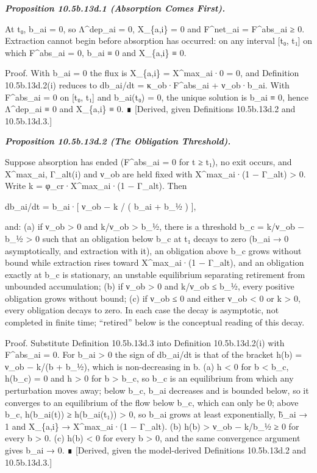 \documentclass[
]{article}
\begin{document}
\emph{\textbf{Proposition 10.5b.13d.1 (Absorption Comes First).}}

At t₀, b\_ai = 0, so Λ\^{}dep\_ai = 0, X\_\{a,i\} = 0 and F\^{}net\_ai =
F\^{}abs\_ai ≥ 0. Extraction cannot begin before absorption has
occurred: on any interval {[}t₀, t₁{]} on which F\^{}abs\_ai = 0, b\_ai
≡ 0 and X\_\{a,i\} ≡ 0.

Proof. With b\_ai = 0 the flux is X\_\{a,i\} = X\^{}max\_ai·0 = 0, and
Definition 10.5b.13d.2(i) reduces to db\_ai/dt = κ\_ob·F\^{}abs\_ai +
ν\_ob·b\_ai. With F\^{}abs\_ai = 0 on {[}t₀, t₁{]} and b\_ai(t₀) = 0,
the unique solution is b\_ai ≡ 0, hence Λ\^{}dep\_ai ≡ 0 and X\_\{a,i\}
≡ 0. ∎ {[}Derived, given Definitions 10.5b.13d.2 and 10.5b.13d.3.{]}

\emph{\textbf{Proposition 10.5b.13d.2 (The Obligation Threshold).}}

Suppose absorption has ended (F\^{}abs\_ai = 0 for t ≥ t₁), no exit
occurs, and X\^{}max\_ai, Γ\_alt(i) and ν\_ob are held fixed with
X\^{}max\_ai·(1 − Γ\_alt) \textgreater{} 0. Write k =
φ\_cr·X\^{}max\_ai·(1 − Γ\_alt). Then

db\_ai/dt = b\_ai·{[} ν\_ob − k / ( b\_ai + b\_½ ) {]},

and: (a) if ν\_ob \textgreater{} 0 and k/ν\_ob \textgreater{} b\_½,
there is a threshold b\_c = k/ν\_ob − b\_½ \textgreater{} 0 such that an
obligation below b\_c at t₁ decays to zero (b\_ai → 0 asymptotically,
and extraction with it), an obligation above b\_c grows without bound
while extraction rises toward X\^{}max\_ai·(1 − Γ\_alt), and an
obligation exactly at b\_c is stationary, an unstable equilibrium
separating retirement from unbounded accumulation; (b) if ν\_ob
\textgreater{} 0 and k/ν\_ob ≤ b\_½, every positive obligation grows
without bound; (c) if ν\_ob ≤ 0 and either ν\_ob \textless{} 0 or k
\textgreater{} 0, every obligation decays to zero. In each case the
decay is asymptotic, not completed in finite time; ``retired'' below is
the conceptual reading of this decay.

Proof. Substitute Definition 10.5b.13d.3 into Definition 10.5b.13d.2(i)
with F\^{}abs\_ai = 0. For b\_ai \textgreater{} 0 the sign of db\_ai/dt
is that of the bracket h(b) = ν\_ob − k/(b + b\_½), which is
non-decreasing in b. (a) h \textless{} 0 for b \textless{} b\_c, h(b\_c)
= 0 and h \textgreater{} 0 for b \textgreater{} b\_c, so b\_c is an
equilibrium from which any perturbation moves away; below b\_c, b\_ai
decreases and is bounded below, so it converges to an equilibrium of the
flow below b\_c, which can only be 0; above b\_c, h(b\_ai(t)) ≥
h(b\_ai(t₁)) \textgreater{} 0, so b\_ai grows at least exponentially,
b̃\_ai → 1 and X\_\{a,i\} → X\^{}max\_ai·(1 − Γ\_alt). (b) h(b)
\textgreater{} ν\_ob − k/b\_½ ≥ 0 for every b \textgreater{} 0. (c) h(b)
\textless{} 0 for every b \textgreater{} 0, and the same convergence
argument gives b\_ai → 0. ∎ {[}Derived, given the model-derived
Definitions 10.5b.13d.2 and 10.5b.13d.3.{]}
\end{document}
